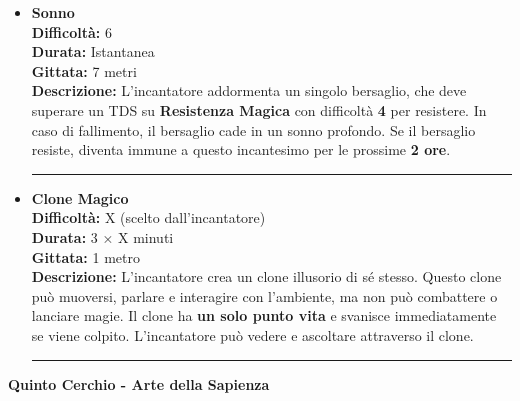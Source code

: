 \documentclass[./magie.tex]{subfiles}
\begin{document}
\begin{itemize}
\item \textbf{Sonno} \\
\textbf{Difficoltà:} 6 \\
\textbf{Durata:} Istantanea \\
\textbf{Gittata:} 7 metri \\
\textbf{Descrizione:} L'incantatore addormenta un singolo bersaglio, che deve superare un TDS su \textbf{Resistenza Magica} con difficoltà \textbf{4} per resistere. In caso di fallimento, il bersaglio cade in un sonno profondo. Se il bersaglio resiste, diventa immune a questo incantesimo per le prossime \textbf{2 ore}.

\vspace{0.2cm}
\noindent
\begin{center}
\rule{\textwidth}{0.4pt} 
\end{center}
\vspace{0.2cm}

\item \textbf{Clone Magico} \\
\textbf{Difficoltà:} X (scelto dall'incantatore) \\
\textbf{Durata:} 3 × X minuti \\
\textbf{Gittata:} 1 metro \\
\textbf{Descrizione:} L'incantatore crea un clone illusorio di sé stesso. Questo clone può muoversi, parlare e interagire con l’ambiente, ma non può combattere o lanciare magie. Il clone ha \textbf{un solo punto vita} e svanisce immediatamente se viene colpito. L'incantatore può vedere e ascoltare attraverso il clone.

\vspace{0.2cm}
\noindent
\begin{center}
\rule{\textwidth}{0.4pt} 
\end{center}
\vspace{0.2cm}

\end{itemize}

\clearpage
\vspace{0.2cm}
{\zarafirtitlefont\Large\bfseries Quinto Cerchio - Arte della Sapienza}
\end{document}

